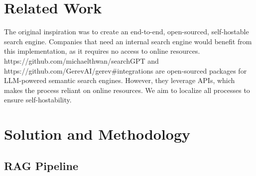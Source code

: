 \documentclass{scrartcl}
\begin{document}

\section{Related Work}
The original inspiration was to create an end-to-end, open-sourced, self-hostable search engine. Companies that need an internal search engine would benefit from this implementation, as it requires no access to online resources.
https://github.com/michaelthwan/searchGPT and https://github.com/GerevAI/gerev#integrations are open-sourced packages for LLM-powered semantic search engines. However, they leverage APIs, which makes the process reliant on online resources. We aim to localize all processes to ensure self-hostability.
\section{Solution and Methodology}
\subsection{RAG Pipeline}
\end{document}
